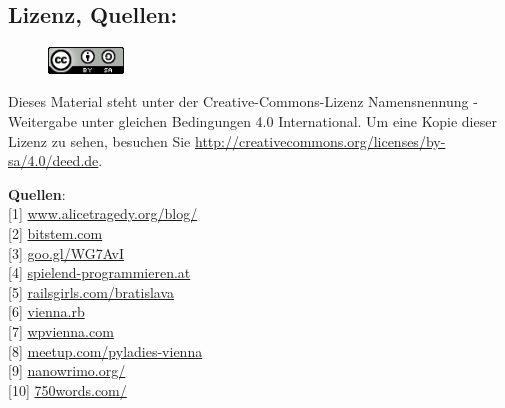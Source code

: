 \subsection*{Lizenz, Quellen:}

\begin{figure}
\includegraphics[width=2cm]{ccbysa88x31.png}
\end{figure}
Dieses Material steht unter der Creative-Commons-Lizenz Namensnennung - Weitergabe unter gleichen Bedingungen 4.0 International. Um eine Kopie dieser Lizenz zu sehen, besuchen Sie \url{http://creativecommons.org/licenses/by-sa/4.0/deed.de}.

\textbf{Quellen}: \\
{[}1{]} \href{http://www.alicetragedy.org/blog/}{www.alicetragedy.org/blog/} \\
{[}2{]} \href{http://bitstem.com}{bitstem.com} \\
{[}3{]} \href{http://www.alicetragedy.org/blog/?p=6271}{goo.gl/WG7AvI} \\
{[}4{]} \href{http://spielend-programmieren.at}{spielend-programmieren.at} \\
{[}5{]} \href{http://railsgirls.com/bratislava}{railsgirls.com/bratislava} \\
{[}6{]} \href{http://vienna-rb.at/}{vienna.rb} \\
{[}7{]} \href{http://wpvienna.com/}{wpvienna.com} \\
{[}8{]} \href{http://www.meetup.com/pyladies-vienna}{meetup.com/pyladies-vienna} \\
{[}9{]} \href{http://nanowrimo.org/}{nanowrimo.org/} \\
{[}10{]} \href{https://750words.com/}{750words.com/} 


